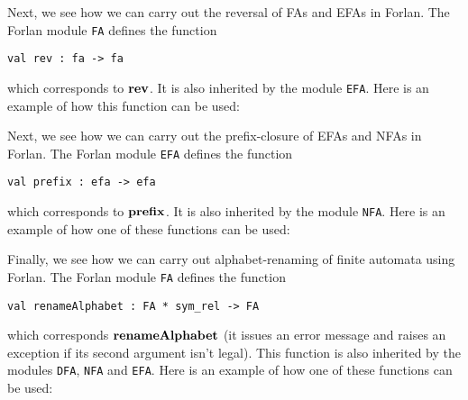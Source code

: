 Next, we see how we can carry out the reversal of FAs and EFAs in
Forlan.  The Forlan module \texttt{FA} defines the function
\begin{verbatim}
val rev : fa -> fa
\end{verbatim}
%
which corresponds to $\mathbf{rev}$.
%
%
%
%
%
%
%
It is also inherited by the module \texttt{EFA}.
%
Here is an example of how this function can be used:


Next, we see how we can carry out the prefix-closure of EFAs and NFAs in
Forlan.  The Forlan module \texttt{EFA} defines the function
\begin{verbatim}
val prefix : efa -> efa
\end{verbatim}
%
which corresponds to $\mathbf{prefix}$.
%
%
%
%
%
%
%
It is also inherited by the module \texttt{NFA}.
%
Here is an example of how one of these functions can be used:


Finally, we see how we can carry out alphabet-renaming of finite
automata using Forlan.
The Forlan module \texttt{FA} defines the function
\begin{verbatim}
val renameAlphabet : FA * sym_rel -> FA
\end{verbatim}
%
which corresponds $\mathbf{renameAlphabet}$ (it issues an error message and
%
%
%
%
%
raises an exception if its second argument isn't legal).
This function is also inherited by the modules \texttt{DFA},
\texttt{NFA} and \texttt{EFA}.
%
%
Here is an example of how one of these functions can be used:



